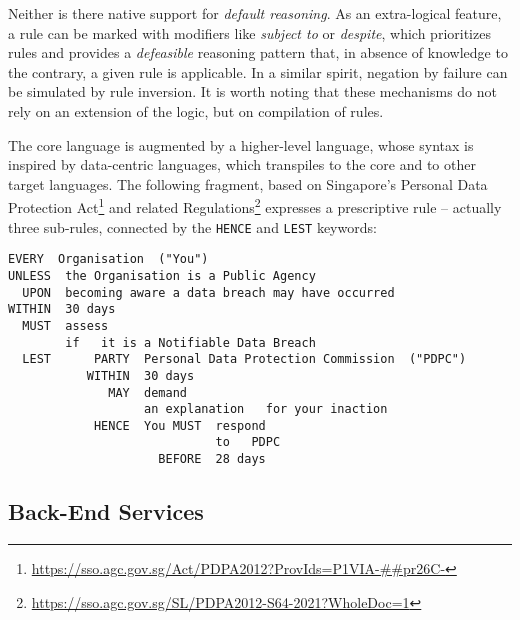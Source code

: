 \documentclass[10pt,a4paper]{article}
\begin{document}
Neither is there native support for \emph{default reasoning}. As an extra-logical feature, a rule can be marked with
modifiers like \emph{subject to} or \emph{despite}, which prioritizes rules and
provides a \emph{defeasible} reasoning pattern that, in absence
of knowledge to the contrary, a given rule is applicable. In a similar spirit,
negation by failure can be simulated by rule inversion. It is worth noting
that these mechanisms do not rely on an extension of the logic, but on
compilation of rules.

The core language is augmented by a higher-level language, whose syntax is inspired by data-centric languages, which transpiles to the core and to other target languages. The following fragment, based on Singapore's Personal Data Protection Act\footnote{\url{https://sso.agc.gov.sg/Act/PDPA2012?ProvIds=P1VIA-##pr26C-}} and related Regulations\footnote{\url{https://sso.agc.gov.sg/SL/PDPA2012-S64-2021?WholeDoc=1}} expresses a prescriptive rule -- actually three sub-rules, connected by the \texttt{HENCE} and \texttt{LEST} keywords:
\begin{lstlisting}[language=L4Sugary]
 EVERY  Organisation  ("You")
UNLESS  the Organisation is a Public Agency
  UPON  becoming aware a data breach may have occurred
WITHIN  30 days
  MUST  assess
        if   it is a Notifiable Data Breach
  LEST      PARTY  Personal Data Protection Commission  ("PDPC")
           WITHIN  30 days
              MAY  demand
                   an explanation   for your inaction
            HENCE  You MUST  respond
                             to   PDPC
                     BEFORE  28 days
\end{lstlisting}

\subsection{Back-End Services}\label{sec:services}

\end{document}
